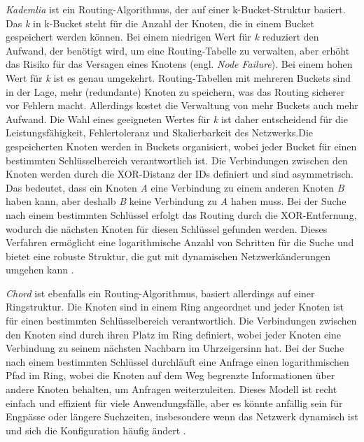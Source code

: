 \textit{Kademlia} ist ein Routing-Algorithmus, der auf einer k-Bucket-Struktur basiert. Das \textit{k} in k-Bucket steht für die Anzahl der Knoten, die in einem Bucket gespeichert werden können. Bei einem niedrigen Wert für \textit{k} reduziert den Aufwand, der benötigt wird, um eine Routing-Tabelle zu verwalten, aber erhöht das Risiko für das Versagen eines Knotens (engl. \textit{Node Failure}). Bei einem hohen Wert für \textit{k} ist es genau umgekehrt. Routing-Tabellen mit mehreren Buckets sind in der Lage, mehr (redundante) Knoten zu speichern, was das Routing sicherer vor Fehlern macht. Allerdings kostet die Verwaltung von mehr Buckets auch mehr Aufwand. Die Wahl eines geeigneten Wertes für \textit{k} ist daher entscheidend für die Leistungsfähigkeit, Fehlertoleranz und Skalierbarkeit des Netzwerks.Die gespeicherten Knoten werden in Buckets organisiert, wobei jeder Bucket für einen bestimmten Schlüsselbereich verantwortlich ist. Die Verbindungen zwischen den Knoten werden durch die XOR-Distanz der IDs definiert und sind asymmetrisch. Das bedeutet, dass ein Knoten  \textit{A} eine Verbindung zu einem anderen Knoten \textit{B} haben kann, aber deshalb \textit{B} keine Verbindung zu \textit{A} haben muss. Bei der Suche nach einem bestimmten Schlüssel erfolgt das Routing durch die XOR-Entfernung, wodurch die nächsten Knoten für diesen Schlüssel gefunden werden. Dieses Verfahren ermöglicht eine logarithmische Anzahl von Schritten für die Suche und bietet eine robuste Struktur, die gut mit dynamischen Netzwerkänderungen umgehen kann \parencite[S. 1-2]{Maymounkov_Kademlia}.

\textit{Chord} ist ebenfalls ein Routing-Algorithmus, basiert allerdings auf einer Ringstruktur. Die Knoten sind in einem Ring angeordnet und jeder Knoten ist für einen bestimmten Schlüsselbereich verantwortlich. Die Verbindungen zwischen den Knoten sind durch ihren Platz im Ring definiert, wobei jeder Knoten eine Verbindung zu seinem nächsten Nachbarn im Uhrzeigersinn hat. Bei der Suche nach einem bestimmten Schlüssel durchläuft eine Anfrage einen logarithmischen Pfad im Ring, wobei die Knoten auf dem Weg begrenzte Informationen über andere Knoten behalten, um Anfragen weiterzuleiten. Dieses Modell ist recht einfach und effizient für viele Anwendungsfälle, aber es könnte anfällig sein für Engpässe oder längere Suchzeiten, insbesondere wenn das Netzwerk dynamisch ist und sich die Konfiguration häufig ändert \parencite[S. 1-3]{Stoica_Chord}.


